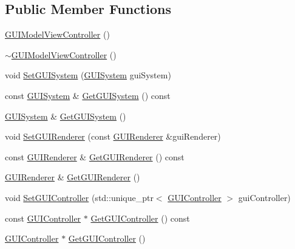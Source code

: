 \subsection*{Public Member Functions}
\begin{DoxyCompactItemize}
\item 
\mbox{\hyperlink{classngl__gui_1_1_g_u_i_model_view_controller_abbe9852d1cc52529dfbdd175c1e27ec1}{G\+U\+I\+Model\+View\+Controller}} ()
\item 
\mbox{\hyperlink{classngl__gui_1_1_g_u_i_model_view_controller_af42d72e9d439309d861161b0a914b88a}{$\sim$\+G\+U\+I\+Model\+View\+Controller}} ()
\item 
void \mbox{\hyperlink{classngl__gui_1_1_g_u_i_model_view_controller_a8f04428e9810125b0fbf14a38a47910d}{Set\+G\+U\+I\+System}} (\mbox{\hyperlink{classngl__gui_1_1_g_u_i_system}{G\+U\+I\+System}} gui\+System)
\item 
const \mbox{\hyperlink{classngl__gui_1_1_g_u_i_system}{G\+U\+I\+System}} \& \mbox{\hyperlink{classngl__gui_1_1_g_u_i_model_view_controller_a3f3dd0ed59d10a38dafd5e7847a8af60}{Get\+G\+U\+I\+System}} () const
\item 
\mbox{\hyperlink{classngl__gui_1_1_g_u_i_system}{G\+U\+I\+System}} \& \mbox{\hyperlink{classngl__gui_1_1_g_u_i_model_view_controller_ad0c0f5afb8f2428a75414ed0d1e5f62d}{Get\+G\+U\+I\+System}} ()
\item 
void \mbox{\hyperlink{classngl__gui_1_1_g_u_i_model_view_controller_a677c75f653cb8334675bf16e65d94294}{Set\+G\+U\+I\+Renderer}} (const \mbox{\hyperlink{classngl__gui_1_1_g_u_i_renderer}{G\+U\+I\+Renderer}} \&gui\+Renderer)
\item 
const \mbox{\hyperlink{classngl__gui_1_1_g_u_i_renderer}{G\+U\+I\+Renderer}} \& \mbox{\hyperlink{classngl__gui_1_1_g_u_i_model_view_controller_a7e0129a2e7d06eb383af11fdfc47baa4}{Get\+G\+U\+I\+Renderer}} () const
\item 
\mbox{\hyperlink{classngl__gui_1_1_g_u_i_renderer}{G\+U\+I\+Renderer}} \& \mbox{\hyperlink{classngl__gui_1_1_g_u_i_model_view_controller_ae8be8d04f4d9f11ed7c2ae0b39091229}{Get\+G\+U\+I\+Renderer}} ()
\item 
void \mbox{\hyperlink{classngl__gui_1_1_g_u_i_model_view_controller_a079bb3f06c3190300ce3dd531c6cb58c}{Set\+G\+U\+I\+Controller}} (std\+::unique\+\_\+ptr$<$ \mbox{\hyperlink{classngl__gui_1_1_g_u_i_controller}{G\+U\+I\+Controller}} $>$ gui\+Controller)
\item 
const \mbox{\hyperlink{classngl__gui_1_1_g_u_i_controller}{G\+U\+I\+Controller}} $\ast$ \mbox{\hyperlink{classngl__gui_1_1_g_u_i_model_view_controller_a3b2bde8db092191a85eb214a11bd3258}{Get\+G\+U\+I\+Controller}} () const
\item 
\mbox{\hyperlink{classngl__gui_1_1_g_u_i_controller}{G\+U\+I\+Controller}} $\ast$ \mbox{\hyperlink{classngl__gui_1_1_g_u_i_model_view_controller_a282cc437e889c538097a4d13c997aa48}{Get\+G\+U\+I\+Controller}} ()
\end{DoxyCompactItemize}


